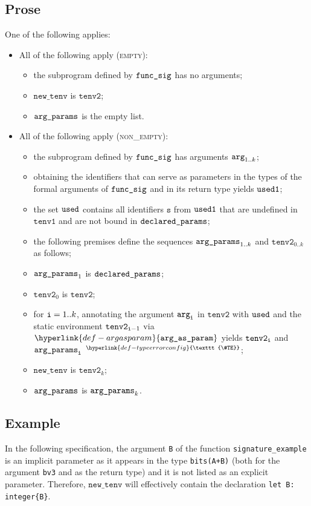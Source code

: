 \documentclass{book}
\newcommand\TypeErrorConfig[0]{\hyperlink{def-typeerrorconfig}{\texttt{\#TE}}}
\newcommand\ProseOrTypeError[0]{\hyperlink{def-proseortypeerror}{$^{\TypeErrorConfig}$}}
\newcommand\argasparam[0]{\hyperlink{def-argasparam}{\texttt{arg\_as\_param}}}
\newcommand\newtenv[0]{\texttt{new\_tenv}}
\newcommand\tenvone[0]{\texttt{tenv1}}
\newcommand\tenvtwo[0]{\texttt{tenv2}}
\newcommand\vs[0]{\texttt{s}}
\begin{document}
\subsection{Prose}
One of the following applies:
\begin{itemize}
  \item All of the following apply (\textsc{empty}):
  \begin{itemize}
    \item the subprogram defined by $\texttt{func\_sig}$ has no arguments;
    \item $\newtenv$ is $\tenvtwo$;
    \item $\texttt{arg\_params}$ is the empty list.
  \end{itemize}

  \item All of the following apply (\textsc{non\_empty}):
  \begin{itemize}
    \item the subprogram defined by $\texttt{func\_sig}$ has arguments $\texttt{arg}_{1..k}$;
    \item obtaining the identifiers that can serve as parameters in the types of the formal arguments of $\texttt{func\_sig}$
          and in its return type yields $\texttt{used1}$;
    \item the set $\texttt{used}$ contains all identifiers $\vs$ from $\texttt{used1}$ that are undefined in $\tenvone$ and are not
          bound in $\texttt{declared\_params}$;
    \item the following premises define the sequences $\texttt{arg\_params}_{1..k}$ and $\tenvtwo_{0..k}$ as follows;
    \item $\texttt{arg\_params}_1$ is $\texttt{declared\_params}$;
    \item $\tenvtwo_0$ is $\tenvtwo$;
    \item for $\texttt{i}=1..k$, annotating the argument $\texttt{arg}_{\texttt{i}}$ in $\tenvtwo$ with $\texttt{used}$ and the static environment $\tenvtwo_{\vi-1}$
          via $\argasparam$ yields $\tenvtwo_\vi$ and $\texttt{arg\_params}_{\texttt{i}}$ \ProseOrTypeError;
    \item $\newtenv$ is $\tenvtwo_k$;
    \item $\texttt{arg\_params}$ is $\texttt{arg\_params}_k$.
  \end{itemize}
\end{itemize}

\subsection{Example}
In the following specification, the argument \texttt{B}
of the function \texttt{signature\_example} is an implicit parameter
as it appears in the type \texttt{bits(A+B)}
(both for the argument \texttt{bv3} and as the return type)
and it is not listed as an explicit parameter.
Therefore, $\newtenv$ will effectively contain the declaration \verb|let B: integer{B}|.
\end{document}
